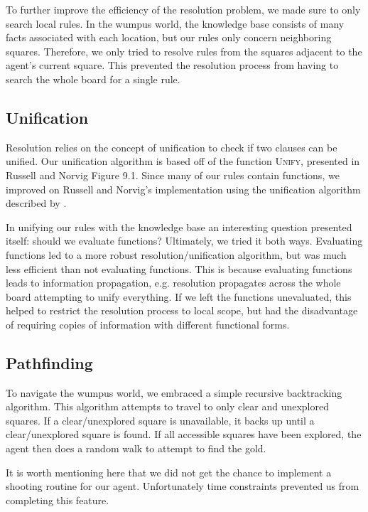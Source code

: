\documentclass{article}
\begin{document}
To further improve the efficiency of the resolution problem, we made sure to only search local rules. 
In the wumpus world, the knowledge base consists of many facts associated with each location, but our rules only concern neighboring squares. 
Therefore, we only tried to resolve rules from the squares adjacent to the agent's current square. 
This prevented the resolution process from having to search the whole board for a single rule.
\subsection{Unification}

Resolution relies on the concept of unification to check if two clauses can be unified\cite{robinson}. 
Our unification algorithm is based off of the function \textsc{Unify}, presented in Russell and Norvig Figure 9.1. Since many of our rules contain functions, we improved on Russell and Norvig's implementation using the unification algorithm described by \cite{robinson}.

In unifying our rules with the knowledge base an interesting question presented itself: should we evaluate functions? Ultimately, we tried it both ways. Evaluating functions led to a more robust resolution/unification algorithm, but was much less efficient than not evaluating functions. This is because evaluating functions leads to information propagation, e.g. resolution propagates across the whole board attempting to unify everything. If we left the functions unevaluated, this helped to restrict the resolution process to local scope, but had the disadvantage of requiring copies of information with different functional forms.

\subsection{Pathfinding}

To navigate the wumpus world, we embraced a simple recursive backtracking algorithm. 
This algorithm attempts to travel to only clear and unexplored squares. 
If a clear/unexplored square is unavailable, it backs up until a clear/unexplored square is found. 
If all accessible squares have been explored, the agent then does a random walk to attempt to find the gold.

It is worth mentioning here that we did not get the chance to implement a shooting routine for our agent. Unfortunately time constraints prevented us from completing this feature.
\end{document}
